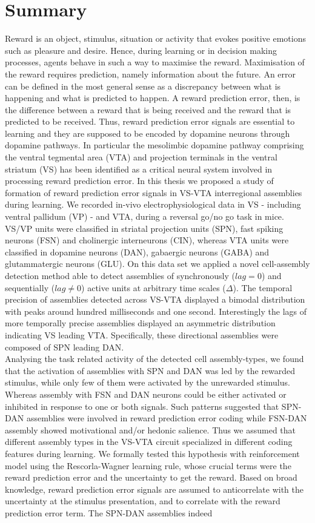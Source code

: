 \section*{Summary}
Reward is an object, stimulus, situation or activity that evokes positive emotions such as pleasure and desire. Hence, during learning or in decision making processes, agents behave in such a way to maximise the reward. Maximisation of the reward requires prediction, namely information about the future. An error can be defined in the most general sense as a discrepancy between what is happening and what is predicted to happen. A reward prediction error, then, is the difference between a reward that is being received and the reward that is predicted to be received. Thus, reward prediction error signals are essential to learning and they are supposed to be encoded by dopamine neurons through dopamine pathways. In particular the mesolimbic dopamine pathway comprising the ventral tegmental area (VTA) and projection terminals in the ventral striatum (VS) has been identified as a critical neural system involved in processing reward prediction error. In this thesis we proposed a study of formation of reward prediction error signals in VS-VTA interregional assemblies during learning. We recorded in-vivo electrophysiological data in VS - including ventral pallidum (VP) - and VTA, during a reversal go/no go task in mice. VS/VP units were classified in striatal projection units (SPN), fast spiking neurons (FSN) and cholinergic interneurons (CIN), whereas VTA units were classified in dopamine neurons (DAN), gabaergic neurons (GABA) and glutammatergic neurons (GLU). On this data set we applied a novel cell-assembly detection method able to detect assemblies of synchronously ($lag=0$) and sequentially ($lag\neq0$) active units at arbitrary time scales ($\Delta$). The temporal precision of assemblies detected across VS-VTA displayed a bimodal distribution with peaks around hundred milliseconds and one second. Interestingly the lags of more temporally precise assemblies displayed an asymmetric distribution indicating VS leading VTA. Specifically, these directional assemblies were composed of SPN leading DAN.\\Analysing the task related activity of the detected cell assembly-types, we found that the activation of assemblies with SPN and DAN was led by the rewarded stimulus, while only few of them were activated by the unrewarded stimulus. Whereas assembly with FSN and DAN neurons could be either activated or inhibited in response to one or both signals. Such patterns suggested that SPN-DAN assemblies were involved in reward prediction error coding while FSN-DAN assembly showed motivational and/or hedonic salience. Thus we assumed that different assembly types in the VS-VTA circuit specialized in different coding features during learning. We formally tested this hypothesis with reinforcement model using the Rescorla-Wagner learning rule, whose crucial terms were the reward prediction error and the uncertainty to get the reward. Based on broad knowledge, reward prediction error signals are assumed to anticorrelate with the uncertainty at the stimulus presentation, and to correlate with the reward prediction error term. The SPN-DAN assemblies indeed 